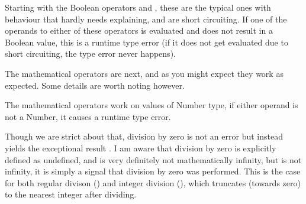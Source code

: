 Starting with the Boolean operators \op{\&\&} and \op{||}, these are the typical
ones with behaviour that hardly needs explaining, and are short circuiting. If
one of the operands to either of these operators is evaluated and does not result
in a Boolean value, this is a runtime type error (if it does not get evaluated
due to short circuiting, the type error never happens).

\begin{prooftree}
\end{prooftree}

\begin{prooftree}
\end{prooftree}

\begin{prooftree}
\end{prooftree}

\begin{prooftree}
\end{prooftree}

\begin{prooftree}
\end{prooftree}

\begin{prooftree}
\end{prooftree}

The mathematical operators are next, and as you might expect they work
as expected. Some details are worth noting however.

The mathematical operators work on values of Number type, if either operand
is not a Number, it causes a runtime type error.

Though we are strict about that, division by zero is not an error but instead
yields the exceptional result . I am aware that division by zero is
explicitly defined as undefined, and is very definitely not mathematically
infinity, but  is not infinity, it is simply a signal that division
by zero was performed. This is the case for both regular divison (\op{/}) and
integer division (\op{//}), which truncates (towards zero) to the nearest
integer after dividing.

